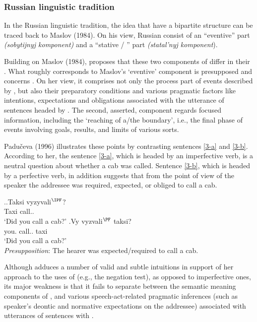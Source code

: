 \subsubsection{Russian linguistic tradition}
In the Russian linguistic tradition, the idea that  have a bipartite structure can be traced back to Maslov (1984). On his view, Russian  consist of an ``eventive'' part \textit{(sobytijnyj komponent)} and a ``stative / '' part \textit{(statal'nyj komponent}).

Building on Maslov (1984), \citet{Paducheva:96, Paducheva:11} proposes that these two components of  differ in their . What roughly corresponds to Maslov's `eventive' component is presupposed and concerns . On her view, it comprises not only the process part of events described by , but also their preparatory conditions and various pragmatic factors like intentions, expectations and obligations associated with the utterance of sentences headed by . The second, asserted, component regards focused information, including the `reaching of a/the boundary', i.e., the final phase of events involving goals, results, and limits of various sorts. 

Padu\v{c}eva (1996) illustrates these points by contrasting sentences \ref{3-a} and \ref{3-b}. According to her, the sentence \ref{3-a}, which is headed by an imperfective verb, is a neutral question about whether a cab was called. Sentence \ref{3-b}, which is headed by a perfective verb, in addition suggests that from the point of view of the speaker the addressee was required, expected, or obliged to call a cab. 

\ex.\label{3}\ag.\label{3-a}Taksi vyzyvali$^{\IPF}$?\\
Taxi call..\\
\trans `Did you call a cab?'
\bg.\label{3-b}Vy vyzvali$^{\PF}$ taksi?\\
you. call.. taxi\\
\trans `Did you call a cab?'\\
\textit{Presupposition}: The hearer was expected/required to call a cab.\\

Although \citet{Paducheva:96} adduces a number of valid and subtle intuitions in support of her approach to the uses of  (e.g., the negation test), as opposed to imperfective ones, its major weakness is that it fails to separate between the semantic meaning components of ,  and various speech-act-related pragmatic inferences (such as speaker's deontic and normative expectations on the addressee) associated with utterances of sentences with . 
 
